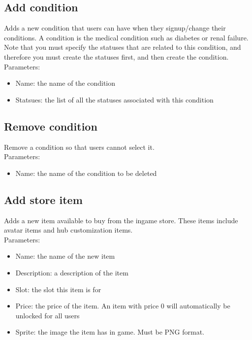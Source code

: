 \documentclass[a4paper,12pt]{article}
\begin{document}
\subsection*{Add condition}
Adds a new condition that users can have when they signup/change their conditions.
A condition is the medical condition such as diabetes or renal failure.
Note that you must specify the statuses that are related to this condition, and therefore you must create the statuses
first, and then create the condition.
Parameters:                                                                                                                                                                       
\begin{itemize}
	\setlength\itemsep{0em}
	\item Name: the name of the condition
	\item Statsues: the list of all the statuses associated with this condition
\end{itemize}

\subsection*{Remove condition}
Remove a condition so that users cannot select it.\\
Parameters:                                                                                                                                                                       
\begin{itemize}
	\setlength\itemsep{0em}
	\item Name: the name of the condition to be deleted
\end{itemize}

\subsection*{Add store item}
Adds a new item available to buy from the ingame store. These items include avatar items and hub customization items.\\
Parameters:
\begin{itemize}
	\setlength\itemsep{0em}
	\item Name: the name of the new item
	\item Description: a description of the item
	\item Slot: the slot this item is for
	\item Price: the price of the item. An item with price 0 will automatically be unlocked for all users
	\item Sprite: the image the item has in game. Must be PNG format.
\end{itemize}	
\end{document}
